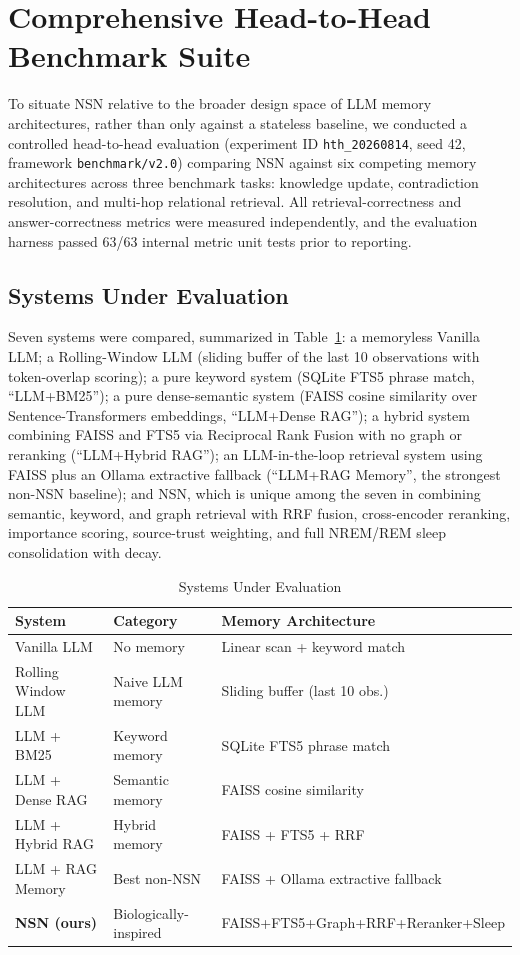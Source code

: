 \documentclass[conference]{IEEEtran}
\begin{document}
\section{Comprehensive Head-to-Head Benchmark Suite}

To situate NSN relative to the broader design space of LLM memory architectures, rather than only against a stateless baseline, we conducted a controlled head-to-head evaluation (experiment ID \texttt{hth\_20260814}, seed 42, framework \texttt{benchmark/v2.0}) comparing NSN against six competing memory architectures across three benchmark tasks: knowledge update, contradiction resolution, and multi-hop relational retrieval. All retrieval-correctness and answer-correctness metrics were measured independently, and the evaluation harness passed 63/63 internal metric unit tests prior to reporting.

\subsection{Systems Under Evaluation}
Seven systems were compared, summarized in Table~\ref{tab:systems}: a memoryless Vanilla LLM; a Rolling-Window LLM (sliding buffer of the last 10 observations with token-overlap scoring); a pure keyword system (SQLite FTS5 phrase match, ``LLM+BM25''); a pure dense-semantic system (FAISS cosine similarity over Sentence-Transformers embeddings, ``LLM+Dense RAG''); a hybrid system combining FAISS and FTS5 via Reciprocal Rank Fusion with no graph or reranking (``LLM+Hybrid RAG''); an LLM-in-the-loop retrieval system using FAISS plus an Ollama extractive fallback (``LLM+RAG Memory'', the strongest non-NSN baseline); and NSN, which is unique among the seven in combining semantic, keyword, and graph retrieval with RRF fusion, cross-encoder reranking, importance scoring, source-trust weighting, and full NREM/REM sleep consolidation with decay.

\begin{table}[t]
\caption{Systems Under Evaluation}
\label{tab:systems}
\centering
\scriptsize
\begin{tabular}{@{}p{2.7cm}p{2.9cm}p{2.2cm}@{}}
\toprule
\textbf{System} & \textbf{Category} & \textbf{Memory Architecture} \\
\midrule
Vanilla LLM & No memory & Linear scan + keyword match \\
Rolling Window LLM & Naive LLM memory & Sliding buffer (last 10 obs.) \\
LLM + BM25 & Keyword memory & SQLite FTS5 phrase match \\
LLM + Dense RAG & Semantic memory & FAISS cosine similarity \\
LLM + Hybrid RAG & Hybrid memory & FAISS + FTS5 + RRF \\
LLM + RAG Memory & Best non-NSN & FAISS + Ollama extractive fallback \\
\textbf{NSN (ours)} & Biologically-inspired & FAISS+FTS5+Graph+RRF+Reranker+Sleep \\
\bottomrule
\end{tabular}
\end{table}
\end{document}
